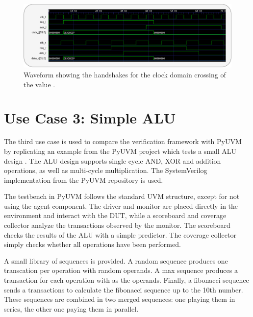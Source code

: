 \begin{figure}[t]
  \centering
  \includegraphics[width=\textwidth]{diagrams/cdc_timing.pdf}
  \caption{Waveform showing the handshakes for the clock domain crossing of the value .}
  \label{fig:cdc_timing}
\end{figure}

\section{Use Case 3: Simple ALU} %

The third use case is used to compare the verification framework with PyUVM by replicating an example from the PyUVM
project which tests a small ALU design \cite{pyuvm_tinyalu}. The ALU design supports single cycle AND, XOR and
addition operations, as well as multi-cycle multiplication. The SystemVerilog implementation from the PyUVM repository is used.

The testbench in PyUVM follows the standard UVM structure, except for not using the agent component. The driver and
monitor are placed directly in the environment and interact with the DUT, while a scoreboard and coverage collector
analyze the transactions observed by the monitor. The scoreboard checks the results of the ALU with a simple
predictor. The coverage collector simply checks whether all operations have been performed.

A small library of sequences is provided. A random sequence produces one transcation per operation with random
operands. A max sequence produces a transaction for each operation with  as the operands. Finally, a
fibonacci sequence sends a transactions to calculate the fibonacci sequence up to the 10th number. These sequences
are combined in two merged sequences: one playing them in series, the other one paying them in parallel.

